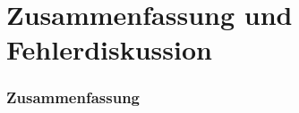 \section{Zusammenfassung und Fehlerdiskussion}
\begin{frame}
	\frametitle{Zusammenfassung}
	
\end{frame}